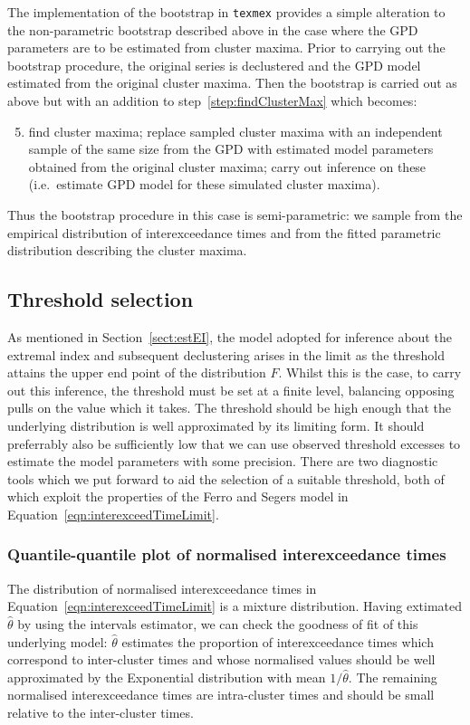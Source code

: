\documentclass[10pt]{article}\usepackage[]{graphicx}\usepackage[]{color}
\begin{document}
The implementation of the bootstrap in {\tt texmex} provides a simple alteration to the non-parametric bootstrap described above in the case where the GPD parameters are to be estimated from cluster maxima.  Prior to carrying out the bootstrap procedure, the original series is declustered and the GPD model estimated from the original cluster maxima.  Then the bootstrap is carried out as above but with an addition to step~\ref{step:findClusterMax} which becomes:
\begin{enumerate}
\setcounter{enumi}{4}
\item find cluster maxima; replace sampled cluster maxima with an independent sample of the same size from the GPD with estimated model parameters obtained from the original cluster maxima; carry out inference on these (i.e.\ estimate GPD model for these simulated cluster maxima).
\end{enumerate}
Thus the bootstrap procedure in this case is semi-parametric: we sample from the empirical distribution of interexceedance times and from the fitted parametric distribution describing the cluster maxima.
%
\subsection{Threshold selection}
\label{sect:thresholdChoice}
%
As mentioned in Section~\ref{sect:estEI}, the model adopted for inference about the extremal index and subsequent declustering arises in the limit as the threshold attains the upper end point of the distribution $F$.  Whilst this is the case, to carry out this inference, the threshold must be set at a finite level, balancing opposing pulls on the value which it takes.  The threshold should be high enough that the underlying distribution is well approximated by its limiting form.  It should preferrably also be sufficiently low that we can use observed threshold excesses to estimate the model parameters with some precision. There are two diagnostic tools which we put forward to aid the selection of a suitable threshold, both of which exploit the properties of the Ferro and Segers model in Equation~\ref{eqn:interexceedTimeLimit}.
%
\subsubsection{Quantile-quantile plot of normalised interexceedance times}
\label{sect:qqplot}
%
The distribution of normalised interexceedance times in Equation~\ref{eqn:interexceedTimeLimit} is a mixture distribution.  Having extimated $\hat\theta$ by using the intervals estimator, we can check the goodness of fit of this underlying model:  $\hat\theta$ estimates the proportion of interexceedance times which correspond to inter-cluster times and whose normalised values should be well approximated by the Exponential distribution with mean $1/\hat\theta$.  The remaining normalised interexceedance times are intra-cluster times and should be small relative to the inter-cluster times.
\end{document}
